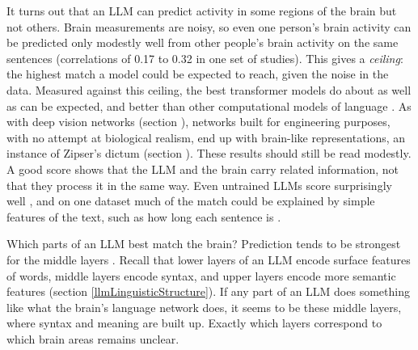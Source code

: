 It turns out that an LLM can predict activity in some regions of the brain but
not others. Brain measurements are noisy, so
even one person's brain activity can be predicted only modestly well from other
people's brain activity on the same sentences (correlations of 0.17 to 0.32 in
one set of studies). This gives a \emph{ceiling}: the highest match a model
could be expected to reach, given the noise in the data. Measured against this
ceiling, the best transformer models do about as well as can be expected, and
better than other computational models of language \cite{schrimpf2021neural}.
As with deep vision networks (section ), networks built
for engineering purposes, with no attempt at biological realism, end up with
brain-like representations, an instance of Zipser's dictum (section
). These results should still be read modestly. A good score shows that the LLM
and the brain carry related information, not that they process it in the same
way. Even untrained LLMs score surprisingly well \cite{schrimpf2021neural}, and
on one dataset much of the match could be explained by simple features of the
text, such as how long each sentence is \cite{feghhi2024what}.

Which parts of an LLM best match the brain? Prediction tends to be strongest
for the middle layers \cite{caucheteux2022brains}. Recall that lower layers of
an LLM encode surface features of words, middle layers encode syntax, and upper
layers encode more semantic features (section \ref{llmLinguisticStructure}). If any part of an LLM does something like what
the brain's language network does, it seems to be these middle layers, where
syntax and meaning are built up. Exactly which layers correspond to which brain
areas remains unclear.

